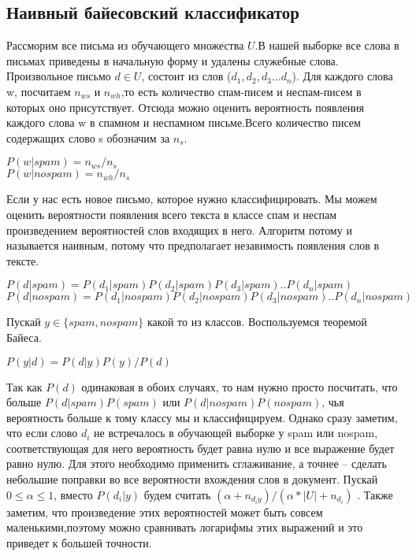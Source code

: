 \documentclass[a4paper, 14pt]{extarticle}
\begin{document}
        \subsection{Наивный байесовский классификатор}	
	    Рассморим все письма из обучающего множества $U$.В нашей выборке все слова в письмах приведены в начальную форму и удалены служебные слова. Произвольное письмо $d\in U$, состоит из слов ($ d_1,d_2,d_3...d_n$). Для каждого слова w, посчитаем $n_{ws}$ и $n_{wh}$,то есть количество спам-писем и неспам-писем в которых оно присутствует. Отсюда можно оценить вероятность появления каждого слова w в спамном и неспамном письме.Всего количество писем содержащих слово s обозначим за $n_{s}$.
	    \newpage
	    \begin{center}
	        $P(w|spam)=n_{ws}/n_s$\\
	        $P(w|nospam)=n_{wh}/n_s$
	    \end{center}
	    Если у нас есть новое письмо, которое нужно классифицировать. Мы можем оценить вероятности появления всего текста в классе спам и неспам произведением вероятностей слов входящих в него. Алгоритм потому и называется наивным, потому что предполагает незавимость появления слов в тексте. 
	    \begin{center}
	        $P(d|spam)=P(d_1|spam)P(d_2|spam)P(d_3|spam)..P(d_n|spam)$
	        $P(d|nospam)=P(d_1|nospam)P(d_2|nospam)P(d_3|nospam)..P(d_n|nospam)$
	    \end{center}
	    Пускай $y\in\{spam,nospam\}$ какой то из классов. Воспользуемся теоремой Байеса.
	    \begin{center}
	        $P(y|d)=P(d|y)P(y)/P(d)$
	    \end{center}
	    Так как $P(d)$ одинаковая в обоих случаях, то
	    нам нужно просто посчитать, что больше $P(d|spam)P(spam)$ или $P(d|nospam)P(nospam)$, чья вероятность больше к тому классу мы и классифицируем. Однако сразу заметим, что если слово $d_i$ не встречалось в обучающей выборке у spam или nospam, соответствующая для него вероятность будет равна нулю и все выражение будет равно нулю. Для этого необходимо применить сглаживание, а точнее – сделать небольшие поправки во все вероятности вхождения слов в документ. Пускай $0\le\alpha\le1$, вместо $P(d_i|y)$ будем считать $(\alpha+{n_{d_{i}y}})/(\alpha*|U|+n_{d_i})$ . Также заметим, что произведение этих вероятностей может быть совсем маленькими,поэтому можно сравнивать логарифмы этих выражений и это приведет к большей точности.
	    
	    
\end{document}
